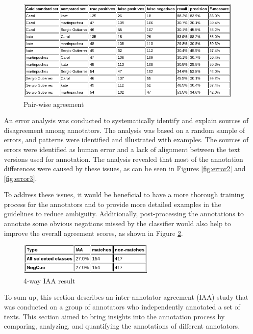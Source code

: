 \begin{figure}
  \includegraphics[width=\linewidth]{Plots and results/pairwise.png}
  \caption{Pair-wise agreement}
  \label{fig:Pairwise agreement}
\end{figure}


An error analysis was conducted to systematically identify and explain sources of disagreement among annotators. The analysis was based on a random sample of errors, and patterns were identified and illustrated with examples. The sources of errors were identified as human error and a lack of alignment between the text versions used for annotation. The analysis revealed that most of the annotation differences were caused by these issues, as can be seen in Figures \ref{fig:error2} and \ref{fig:error3}.

To address these issues, it would be beneficial to have a more thorough training process for the annotators and to provide more detailed examples in the guidelines to reduce ambiguity. Additionally, post-processing the annotations to annotate some obvious negations missed by the classifier would also help to improve the overall agreement scores, as shown in Figure \ref{fig:4way}.

\begin{figure}[!h]
\begin{center}
  \includegraphics[width=0.6\textwidth]{Plots and results/4way.png}
  \caption{4-way IAA result}
  \label{fig:4way}
\end{center}  
\end{figure}


To sum up, this section describes an inter-annotator agreement (IAA) study that was conducted on a group of annotators who independently annotated a set of texts. This section aimed to bring insights into the annotation process by comparing, analyzing, and quantifying the annotations of different annotators. 

